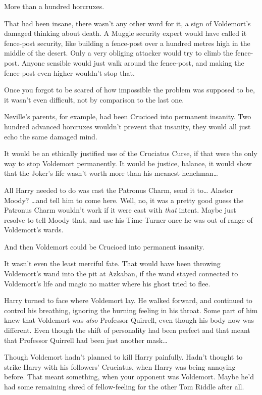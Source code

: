 More than a hundred horcruxes.

That had been insane, there wasn't any other word for it, a sign of Voldemort's damaged thinking about death. A Muggle security expert would have called it fence-post security, like building a fence-post over a hundred metres high in the middle of the desert. Only a very obliging attacker would try to climb the fence-post. Anyone sensible would just walk around the fence-post, and making the fence-post even higher wouldn't stop that.

Once you forgot to be scared of how impossible the problem was supposed to be, it wasn't even difficult, not by comparison to the last one.

Neville's parents, for example, had been Crucioed into permanent insanity. Two hundred advanced horcruxes wouldn't prevent that insanity, they would all just echo the same damaged mind.

It would be an ethically justified use of the Cruciatus Curse, if that were the only way to stop Voldemort permanently. It would be justice, balance, it would show that the Joker's life wasn't worth more than his meanest henchman{\ldots}

All Harry needed to do was cast the Patronus Charm, send it to{\ldots} Alastor Moody? {\ldots}and tell him to come here. Well, no, it was a pretty good guess the Patronus Charm wouldn't work if it were cast with \emph{that} intent. Maybe just resolve to tell Moody that, and use his Time-Turner once he was out of range of Voldemort's wards.

And then Voldemort could be Crucioed into permanent insanity.

It wasn't even the least merciful fate. That would have been throwing Voldemort's wand into the pit at Azkaban, if the wand stayed connected to Voldemort's life and magic no matter where his ghost tried to flee.

Harry turned to face where Voldemort lay. He walked forward, and continued to control his breathing, ignoring the burning feeling in his throat. Some part of him knew that Voldemort was \emph{also} Professor Quirrell, even though his body now was different. Even though the shift of personality had been perfect and that meant that Professor Quirrell had been just another mask{\ldots}

Though Voldemort hadn't planned to kill Harry painfully. Hadn't thought to strike Harry with his followers' Cruciatus, when Harry was being annoying before. That meant something, when your opponent was Voldemort. Maybe he'd had some remaining shred of fellow-feeling for the other Tom Riddle after all.

